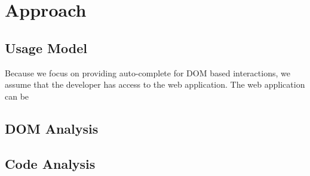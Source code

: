 \section{Approach}
\label{Sec:Approach}

	
	\subsection{Usage Model}
	\label{Sec:Model}
		Because we focus on providing auto-complete for DOM based interactions, we assume that the developer has access to the web application. The web application can be 
	
	
	\subsection{DOM Analysis}
	\label{Sec:DOM-Analysis}
	
	\subsection{Code Analysis}
	\label{Sec:Code-Analysis}